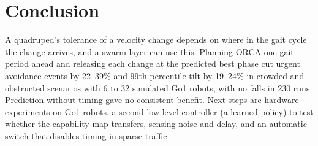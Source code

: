 \section{Conclusion}\label{sec:conclusion}

A quadruped's tolerance of a velocity change depends on where in the gait cycle the change arrives, and a swarm
layer can use this. Planning ORCA one gait period ahead and releasing each change at the predicted best phase cut
urgent avoidance events by 22--39\% and 99th-percentile tilt by 19--24\% in crowded and obstructed scenarios with
6 to 32 simulated Go1 robots, with no falls in 230 runs. Prediction without timing gave no consistent benefit.
Next steps are hardware experiments on Go1 robots, a second low-level controller (a learned policy) to test
whether the capability map transfers, sensing noise and delay, and an automatic switch that disables timing in
sparse traffic.
